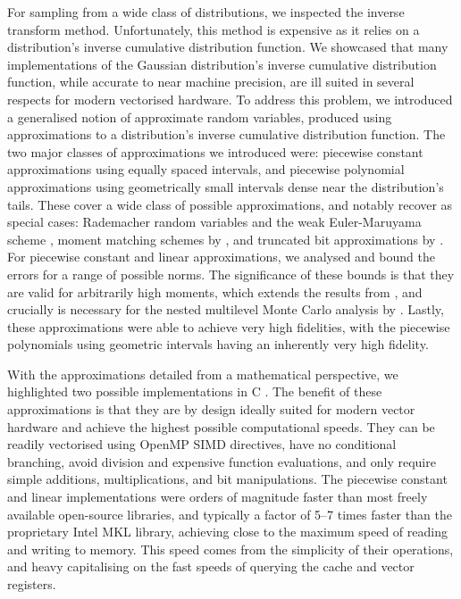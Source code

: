 \documentclass[manuscript,review]{acmart}
\begin{document}
For sampling from a wide class of distributions, we inspected the inverse transform method. Unfortunately, this method is expensive as it relies on a distribution's inverse cumulative distribution function. We showcased that many implementations of the Gaussian distribution's inverse cumulative distribution function, while accurate to near machine precision, are ill suited in several respects for modern vectorised hardware. To address this problem, we introduced a generalised notion of approximate random variables, produced using approximations to a distribution's inverse cumulative distribution function. The two major classes of approximations we introduced were: piecewise constant approximations using equally spaced intervals, and piecewise polynomial approximations using geometrically small intervals dense near the distribution's tails. These cover a wide class of possible approximations, and notably recover as special cases: Rademacher random variables and the weak Euler-Maruyama scheme \citep{glasserman2013monte}, moment matching schemes by \citet{muller2015improving}, and truncated bit approximations by \citet{giles2019random_quadrature}. For piecewise constant and linear approximations, we analysed and bound the errors for a range of possible norms. The significance of these bounds is that they are valid for arbitrarily high moments, which extends the results from \citet{giles2019random_quadrature}, and crucially is necessary for the nested multilevel Monte Carlo analysis by \citet{giles2020approximate}. Lastly, these approximations were able to achieve very high fidelities, with the piecewise polynomials using geometric intervals having an inherently very high fidelity. 

With the approximations detailed from a mathematical perspective, we highlighted two possible implementations in C \citep{sheridan2020approximate_random}. The benefit of these approximations is that they are by design ideally suited for modern vector hardware and achieve the highest possible computational speeds. They can be readily vectorised using OpenMP SIMD directives, have no conditional branching, avoid division and expensive function evaluations, and only require simple additions, multiplications, and bit manipulations. The piecewise constant and linear implementations were orders of magnitude faster than most freely available open-source libraries, and typically a factor of 5--7 times faster than the proprietary Intel MKL library, achieving close to the maximum speed of reading and writing to memory. This speed comes from the simplicity of their operations, and heavy capitalising on the fast speeds of querying the cache and vector registers. 
\end{document}
